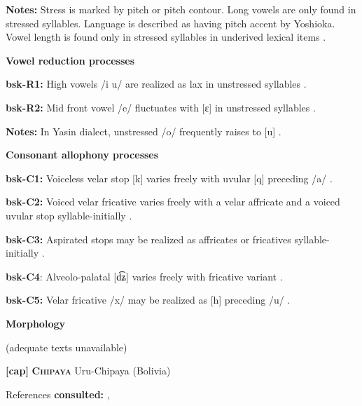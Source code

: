 \textbf{Notes:} Stress is marked by pitch or pitch contour. Long vowels are only found in stressed syllables. Language is described as having pitch accent by Yoshioka. Vowel length is found only in stressed syllables in underived lexical items \citep{Anderson1028}.



\textbf{Vowel reduction processes}



\textbf{bsk-R1:} High vowels /i u/ are realized as lax in unstressed syllables \citep[1029]{Anderson1997}.



\textbf{bsk-R2:} Mid front vowel /e/ fluctuates with [ɛ] in unstressed syllables \citep[1029]{Anderson1997}.



\textbf{Notes:} In Yasin dialect, unstressed /o/ frequently raises to [u] \citep[1038]{Anderson1997}.



\textbf{Consonant allophony processes}



\textbf{bsk-C1:} Voiceless velar stop [k] varies freely with uvular [q] preceding /a/ \citep[1025]{Anderson1997}.



\textbf{bsk-C2:} Voiced velar fricative varies freely with a velar affricate and a voiced uvular stop syllable-initially \citep[1025]{Anderson1997}.



\textbf{bsk-C3:} Aspirated stops may be realized as affricates or fricatives syllable-initially \citep[1025]{Anderson1997}.



\textbf{bsk-C4}: Alveolo-palatal [d͡ʑ] varies freely with fricative variant \citep[1025]{Anderson1997}.



\textbf{bsk-C5:} Velar fricative /x/ may be realized as [h] preceding /u/ \citep[1025]{Anderson1997}.



\textbf{Morphology}



(adequate texts unavailable)



\textbf{[cap]}   \textbf{\textsc{Chipaya}}  Uru-Chipaya (Bolivia)



References \textbf{consulted:} \citet{Cerrón-Palomino2006}, \citet{Olson1967}



